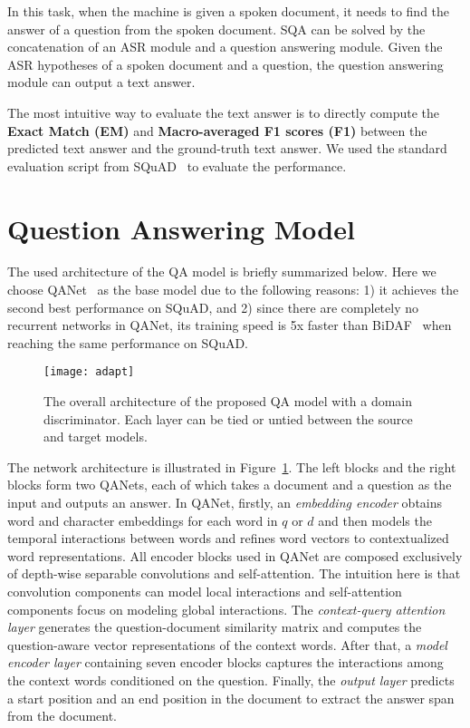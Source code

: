 \documentclass{article}
\begin{document}
In this task, when the machine is given a spoken document, it needs to find the answer of a question from the spoken document. 
SQA can be solved by the concatenation of an ASR module and a question answering module.
Given the ASR hypotheses of a spoken document and a question, the question answering module can output a text answer. 

The most intuitive way to evaluate the text answer is to directly compute the \textbf{Exact Match (EM)} and \textbf{Macro-averaged F1 scores (F1)} between the predicted text answer and the ground-truth text answer.
We used the standard evaluation script from SQuAD~\cite{rajpurkar2016squad} to evaluate the performance. 


\section{Question Answering Model}
\label{sec:QA model}

The used architecture of the QA model is briefly summarized below.
Here we choose QANet~\cite{yu2018qanet} as the base model due to the following reasons:
1) it achieves the second best performance on SQuAD, and
2) since there are completely no recurrent networks in QANet, its training speed is 5x faster than BiDAF~\cite{seo2016bidirectional} when reaching the same performance on SQuAD.

\begin{figure}[t]
  \centering
  \texttt{[image: adapt]}
  \caption{The overall architecture of the proposed QA model with a domain discriminator. 
  Each layer can be tied or untied between the source and target models.}
  \label{fig:GAN}
\end{figure}


The network architecture is illustrated in Figure~\ref{fig:GAN}.
The left blocks and the right blocks form two QANets, each of which takes a document and a question as the input and outputs an answer.
In QANet, firstly, an \emph{embedding encoder} obtains word and character embeddings for each word in $q$ or $d$ and then models the temporal interactions between words and refines word vectors to contextualized word representations. 
All encoder blocks used in QANet are composed exclusively of depth-wise separable convolutions and self-attention.
The intuition here is that convolution components can model local interactions and self-attention components focus on modeling global interactions. 
The \emph{context-query attention layer} generates the question-document similarity matrix and computes the question-aware vector representations of the context words. 
After that, a \emph{model encoder layer} containing seven encoder blocks captures the interactions among the context words conditioned on the question. Finally, the \emph{output layer} predicts a start position and an end position in the document to extract the answer span from the document. 
\end{document}
